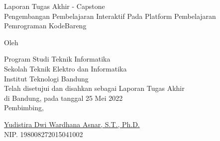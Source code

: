 \clearpage
\pagestyle{empty}

\begin{center}
    \smallskip

    \Large \bfseries \MakeUppercase{\thetitle}
    \vfill

    \Large Laporan Tugas Akhir - Capstone \\
    Pengembangan Pembelajaran Interaktif Pada Platform Pembelajaran Pemrograman KodeBareng
    \vfill

    \large Oleh

    \Large \theauthor

    \large Program Studi Teknik Informatika \\

    \normalsize \normalfont
    Sekolah Teknik Elektro dan Informatika \\
    Institut Teknologi Bandung \\

    \vfill
    \normalsize \normalfont
    Telah disetujui dan disahkan sebagai Laporan Tugas Akhir \\
    di Bandung, pada tanggal 25 Mei 2022 \\

    \vspace{0.3cm}
    Pembimbing,

    \vspace{2cm}
    \underline{Yudistira Dwi Wardhana Asnar, S.T., Ph.D.} \\
    NIP. 198008272015041002

\end{center}
\clearpage
